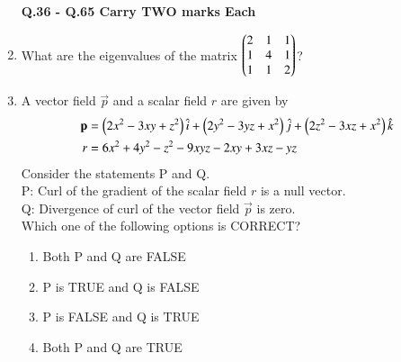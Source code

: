 \documentclass[journal,12pt,onecolumn]{article}
\theoremstyle{remark}
\begin{document}
\begin{enumerate}
    \hfill{}

    \textbf{Q.36 - Q.65 Carry TWO marks Each}
    \item What are the eigenvalues of the matrix $\begin{pmatrix}2 & 1 & 1 \\ 1 & 4 & 1 \\ 1 & 1 & 2\end{pmatrix}$?
    
    \hfill{}
    \begin{enumerate}
    \end{enumerate}

    \item A vector field $\vec{p}$ and a scalar field $r$ are given by
    \begin{align}
        \mathbf{p} &= \left(2x^2 - 3xy + z^2\right)\hat{i} + \left(2y^2 - 3yz + x^2\right)\hat{j} + \left(2z^2 - 3xz + x^2\right)\hat{k} \\
        r &= 6x^2 + 4y^2 - z^2 - 9xyz - 2xy + 3xz - yz
    \end{align}
    Consider the statements P and Q. \\
    P: Curl of the gradient of the scalar field $r$ is a null vector. \\
    Q: Divergence of curl of the vector field $\vec{p}$ is zero. \\
    Which one of the following options is CORRECT?
    
    \hfill{}
    \begin{enumerate}
        \item Both P and Q are FALSE
        \item P is TRUE and Q is FALSE
        \item P is FALSE and Q is TRUE
        \item Both P and Q are TRUE
    \end{enumerate}
    

\end{enumerate}
\end{document}

